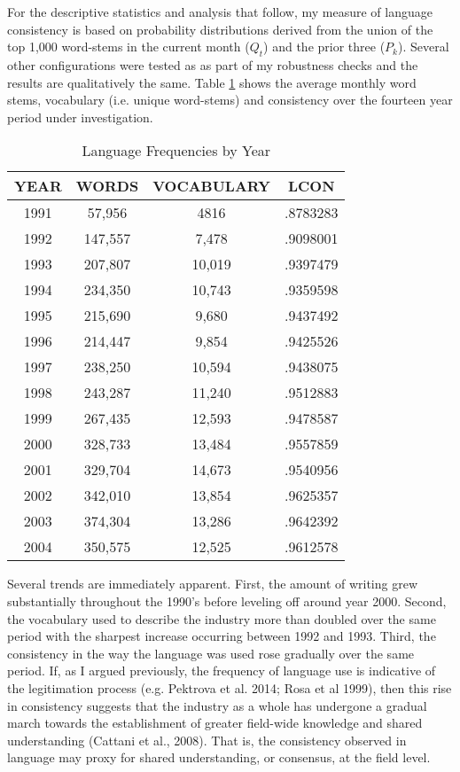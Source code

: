 For the descriptive statistics and analysis that follow, my measure of language consistency is based on probability distributions derived from the union of the top 1,000 word-stems in the current month ($Q_t$) and the prior three ($P_k$). Several other configurations were tested as as part of my robustness checks and the results are qualitatively the same. Table \ref{freq} shows the average monthly word stems, vocabulary (i.e. unique word-stems) and consistency over the fourteen year period under investigation.


\begin{table}[p!]
\begin{center}
\caption[Language Frequencies by Year]{Language Frequencies by Year \label{freq}}
\vspace{0.3in}
\begin{tabular}{cccc}
\hline 
\hline
YEAR & WORDS & VOCABULARY & LCON \\
\hline
1991 & 57,956 & 4816 & .8783283 \\
1992	 & 147,557 & 7,478 & .9098001 \\
1993 &  207,807 & 10,019 & .9397479 \\
1994 &  234,350 & 10,743 & .9359598 \\
1995 &  215,690 & 9,680 & .9437492 \\
1996 &  214,447 & 9,854 & .9425526 \\
1997 &  238,250 & 10,594 & .9438075 \\
1998 &  243,287 & 11,240 & .9512883 \\
1999 &  267,435 & 12,593 & .9478587 \\
2000 &  328,733 & 13,484 & .9557859 \\
2001 &  329,704 & 14,673 & .9540956 \\
2002 &  342,010 & 13,854 & .9625357 \\
2003 &  374,304 & 13,286 & .9642392 \\
2004 &  350,575 & 12,525 & .9612578 \\
\hline
\end{tabular}
\end{center}
\end{table}

Several trends are immediately apparent. First, the amount of writing grew substantially throughout the 1990's before leveling off around year 2000. Second, the vocabulary used to describe the industry more than doubled over the same period with the sharpest increase occurring between 1992 and 1993. Third, the consistency in the way the language was used rose gradually over the same period. If, as I argued previously, the frequency of language use is indicative of the legitimation process (e.g. Pektrova et al. 2014; Rosa et al 1999), then this rise in consistency suggests that the industry as a whole has undergone a gradual march towards the establishment of greater field-wide knowledge and shared understanding (Cattani et al., 2008). That is, the consistency observed in language may proxy for shared understanding, or consensus, at the field level.

